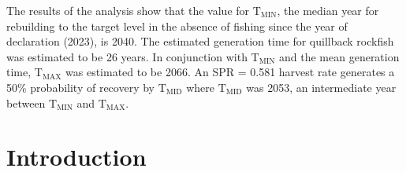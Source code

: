 \documentclass[11pt,
  english,
  a4paper,
]{article}
\begin{document}
\leavevmode\tagmcend\tagstructend\par


The results of the analysis show that the value for {\(\text{T}_\text{MIN}\)\leavevmode\tagmcend\tagstructend}, the median year for rebuilding to the target level in the absence of fishing since the year of declaration (2023), is 2040. The estimated generation time for quillback rockfish was estimated to be 26 years. In conjunction with {\(\text{T}_\text{MIN}\)\leavevmode\tagmcend\tagstructend} and the mean generation time, {\(\text{T}_\text{MAX}\)\leavevmode\tagmcend\tagstructend} was estimated to be 2066. An SPR = 0.581 harvest rate generates a 50\% probability of recovery by {\(\text{T}_\text{MID}\)\leavevmode\tagmcend\tagstructend} where {\(\text{T}_\text{MID}\)\leavevmode\tagmcend\tagstructend} was 2053, an intermediate year between {\(\text{T}_\text{MIN}\)\leavevmode\tagmcend\tagstructend} and {\(\text{T}_\text{MAX}\)\leavevmode\tagmcend\tagstructend}.

\leavevmode\tagmcend\tagstructend\par

\pagebreak
\setlength{\parskip}{5mm plus1mm minus1mm}
\setcounter{page}{1}
\renewcommand{\thefigure}{\arabic{figure}}
\renewcommand{\thetable}{\arabic{table}}
\setcounter{table}{0}
\setcounter{figure}{0}

\setlength\parskip{0.2em plus 0.1em minus 0.2em}


\hypertarget{introduction}{%
\section{Introduction}\label{introduction}}

\leavevmode\tagmcend\tagstructend

\end{document}
